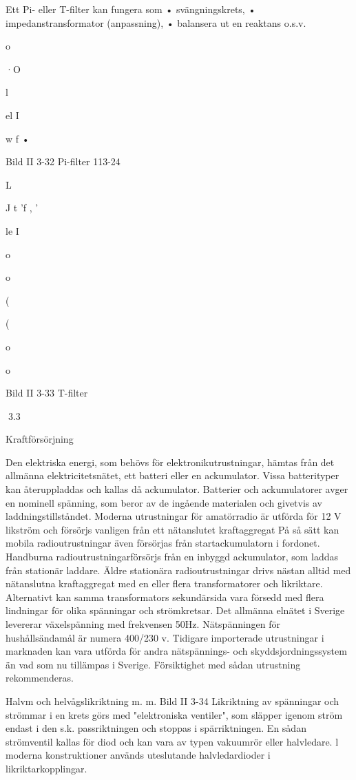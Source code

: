 {{{Ett Pi- eller T-filter kan fungera som
• svängningskrets,
• impedanstransformator (anpassning),
• balansera ut en reaktans o.s.v.

o

·O

l

el
I

w f •

Bild II 3-32 Pi-filter
113-24

L

J t 'f , '

le
I

o

o

(

(

o

o

Bild II 3-33 T-filter

3.3

Kraftförsörjning

Den elektriska energi, som behövs för elektronikutrustningar, hämtas från det allmänna elektricitetsnätet, ett batteri eller en ackumulator. Vissa batterityper kan återuppladdas och kallas då ackumulator.
Batterier och ackumulatorer avger en
nominell spänning, som beror av de ingående materialen och givetvis av laddningstillståndet. Moderna utrustningar för amatörradio är utförda för 12 V likström och försörjs
vanligen från ett nätanslutet kraftaggregat
På så sätt kan mobila radioutrustningar även
försörjas från startackumulatorn i fordonet.
Handburna radioutrustningarförsörjs från
en inbyggd ackumulator, som laddas från
stationär laddare.
Äldre stationära radioutrustningar drivs
nästan alltid med nätanslutna kraftaggregat
med en eller flera transformatorer och likriktare. Alternativt kan samma transformators
sekundärsida vara försedd med flera lindningar för olika spänningar och strömkretsar.
Det allmänna elnätet i Sverige levererar
växelspänning med frekvensen 50Hz. Nätspänningen för hushållsändamål är numera
400/230 v.
Tidigare importerade utrustningar i marknaden kan vara utförda för andra nätspännings- och skyddsjordningssystem än vad
som nu tillämpas i Sverige. Försiktighet med
sådan utrustning rekommenderas.

Halvm och helvågslikriktning m. m.
Bild II 3-34
Likriktning av spänningar och strömmar i en
krets görs med "elektroniska ventiler", som
släpper igenom ström endast i den s.k. passriktningen och stoppas i spärriktningen. En
sådan strömventil kallas för diod och kan
vara av typen vakuumrör eller halvledare. l
moderna konstruktioner används uteslutande halvledardioder i likriktarkopplingar.

}}}
